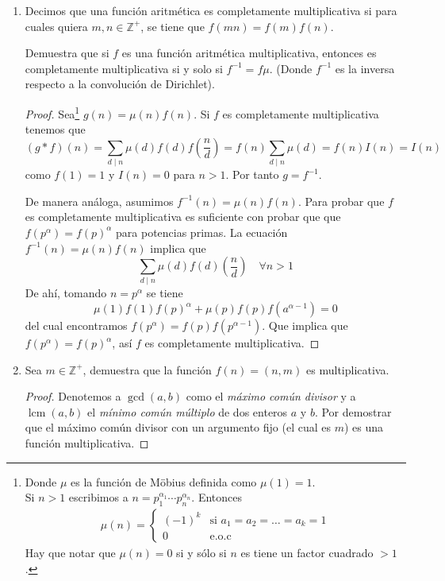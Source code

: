 \documentclass[letterpaper]{article}
\newcommand{\Z}{\mathbb{Z}}
\DeclareMathOperator{\lcm}{lcm}
\begin{document}
\begin{enumerate}
\begin{proof}
\end{proof}

\item Decimos que una función aritmética es completamente multiplicativa si para cuales quiera $m, n \in \Z^+$,
se tiene que $f(mn) = f(m)f(n)$.

Demuestra que si $f$ es una función aritmética multiplicativa, entonces es completamente multiplicativa si y
solo si $f^{-1}=f\mu$. (Donde $f^{-1}$ es la inversa respecto a la convolución de Dirichlet).
\begin{proof}
    Sea\footnote{Donde $\mu$ es la función de Möbius definida como $\mu(1) = 1$.\\ Si $n > 1$ escribimos a
    $n = p_1^{\alpha_1} \cdots p_n^{\alpha_n}$. Entonces
    \begin{align*}
        \mu(n) = 
            \begin{cases}
                (-1)^k & \text{si } a_1 = a_2 = \ldots = a_k = 1\\
                0 & \text{e.o.c}
            \end{cases}
    \end{align*}
    Hay que notar que $\mu(n) = 0$ si y sólo si $n$ es tiene un factor cuadrado $> 1$.
    }
    $g(n) = \mu(n)f(n)$. Si $f$ es completamente multiplicativa tenemos que 
    \[
        (g \ast f)(n) = \sum_{d \mid n} \mu(d)f(d) f\left(\frac{n}{d}\right)
            = f(n) \sum_{d \mid n} \mu(d) = f(n) I(n) = I(n)
    \]
    como $f(1) = 1$ y $I(n) = 0$ para $n > 1$. Por tanto $g = f^{-1}$.

    De manera análoga, asumimos $f^{-1}(n) = \mu(n)f(n)$. Para probar que $f$ es completamente multiplicativa
    es suficiente con probar que que $f(p^{\alpha}) = f(p)^\alpha$ para potencias primas. La ecuación
    $f^{-1}(n) = \mu(n)f(n)$ implica que
    \[
        \sum_{d \mid n} \mu(d) f(d) \left(\frac{n}{d}\right) \quad \forall n > 1
    \]
    De ahí, tomando $n = p^\alpha$ se tiene
    \[
        \mu(1)f(1)f(p)^\alpha + \mu(p)f(p)f(a^{\alpha - 1}) = 0
    \]
    del cual encontramos $f(p^\alpha) = f(p)f(p^{\alpha-1})$. Que implica que $f(p^\alpha) = f(p)^\alpha$, así
    $f$ es completamente multiplicativa.
\end{proof}


\item Sea $m \in \Z^+$, demuestra que la función $f(n)=(n,m)$ es multiplicativa.
\begin{proof}
Denotemos a $\gcd(a, b)$ como el \emph{máximo común divisor} y a $\lcm(a, b)$ el \emph{mínimo común múltiplo}
de dos enteros $a$ y $b$. Por demostrar que el máximo común divisor con un argumento fijo (el cual es $m$) es
una función multiplicativa.


\end{proof}
\end{enumerate}
\end{document}
